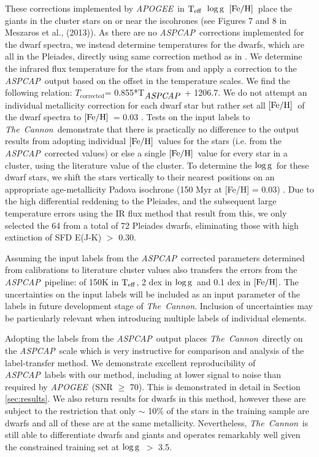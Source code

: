 \documentclass[12pt, preprint]{aastex}
\newcommand{\teff}{\mbox{$\rm T_{eff}$}}
\newcommand{\feh}{\mbox{$\rm [Fe/H]$}}
\newcommand{\logg}{\mbox{$\rm \log g$}}
\newcommand{\tc}{\textsl{The~Cannon}}
\newcommand{\apogee}{\textsl{APOGEE}}
\newcommand{\aspcap}{\textsl{ASPCAP}}
\begin{document}
These corrections implemented by \apogee\ in \teff\, \logg\, \feh\ place the giants in the cluster stars on or near the iscohrones (see Figures 7 and 8 in Meszaros et al., (2013)).  As there are no \aspcap\ corrections implemented for the dwarf spectra, we instead determine temperatures for the dwarfs, which are all in the Pleiades, directly using same correction method as in \citet{Meszaros2013}. We determine the infrared flux temperature for the stars from \citep{Gonzalez2009} and apply a correction to the \aspcap\ output based on the offset in the temperature scales. We find the following relation: $T_{\mbox{corrected}}$= 0.855*T$_{\mbox{\textit{ASPCAP}}}$ + 1206.7. We do not attempt an individual metallicity correction for each dwarf star but rather set all \feh\ of the dwarf spectra to \feh\ = 0.03 \citep{Barrado2001}. Tests on the input labels to \tc\ demonstrate that there is practically no difference to the output results from adopting individual \feh\ values for the stars (i.e. from the \aspcap\ corrected values) or else a single \feh\ value for every star in a cluster, using the literature value of the cluster. To determine the \logg\ for these dwarf stars, we shift the stars vertically to their nearest positions on an appropriate age-metallicity Padova isochrone (150 Myr at [Fe/H] = 0.03) \citep{Girardi2010}. Due to the high differential reddening to the Pleiades, and the subsequent large temperature errors using the IR flux method that result from this, we only selected the 64 from a total of 72 Pleiades dwarfs, eliminating those with high extinction of SFD E(J-K) $>$ 0.30.

Assuming the input labels from the \aspcap\ corrected parameters determined from calibrations to literature cluster values also transfers the errors from the \aspcap\ pipeline: of 150K in \teff,  2 dex in \logg\ and 0.1 dex in \feh.   The uncertainties on the input labels will be included as an input parameter of the labels in future development stage of \tc. Inclusion of uncertainties may be particularly relevant when introducing multiple labels of individual elements. 

Adopting the labels from the \aspcap\ output places \tc\ directly on the \aspcap\ scale which is very instructive for comparison and analysis of the label-transfer method. We demonstrate excellent reproducibility of \aspcap\ labels with our method, including at lower signal to noise than required by \apogee\ (SNR $\ge$ 70). This is demonstrated in detail in Section \ref{sec:results}. We also return results for dwarfs in this method, however these are subject to the restriction that only $\sim$ 10\% of the stars in the training sample are dwarfs and all of these are at the same metallicity. Nevertheless, \tc\ is still able to differentiate dwarfs and giants and operates remarkably well given the constrained training set at \logg\ $>$ 3.5. 
\end{document}
